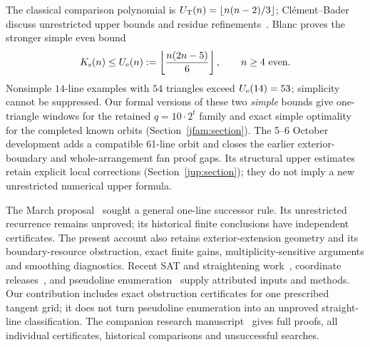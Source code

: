 The classical comparison polynomial is $U_{\mathrm T}(n)=\left\lfloor n(n-2)/3\right\rfloor$; Cl\'ement--Bader discuss unrestricted upper bounds and residue refinements~\cite{clementbader2007}. Blanc proves the stronger simple even bound~\cite{blanc2011}
\begin{equation}\label{j:blanc}
 K_{\mathrm s}(n)\le U_{\rm e}(n):=\left\lfloor\frac{n(2n-5)}6\right\rfloor,\qquad n\ge4\text{ even}.
\end{equation}
Nonsimple $14$-line examples with $54$ triangles exceed $U_{\rm e}(14)=53$; simplicity cannot be suppressed. Our formal versions of these two \emph{simple} bounds give one-triangle windows for the retained $q=10\cdot2^t$ family and exact simple optimality for the completed known orbits (Section~\ref{jfam:section}). The 5--6 October development adds a compatible 61-line orbit and closes the earlier exterior-boundary and whole-arrangement fan proof gaps. Its structural upper estimates retain explicit local corrections (Section~\ref{jup:section}); they do not imply a new unrestricted numerical upper formula.

The March proposal~\cite{zarzuelo2026} sought a general one-line successor rule. Its unrestricted recurrence remains unproved; its historical finite conclusions have independent certificates. The present account also retains exterior-extension geometry and its boundary-resource obstruction, exact finite gains, multiplicity-sensitive arguments and smoothing diagnostics. Recent SAT and straightening work~\cite{savchuk2025}, coordinate releases~\cite{maiorana2026,parpalakutkinGallery2026}, and pseudoline enumeration~\cite{parpalakutkinEnumeration2026} supply attributed inputs and methods. Our contribution includes exact obstruction certificates for one prescribed tangent grid; it does not turn pseudoline enumeration into an unproved straight-line classification. The companion research manuscript~\cite{zarzueloFull2026} gives full proofs, all individual certificates, historical comparisons and unsuccessful searches.
